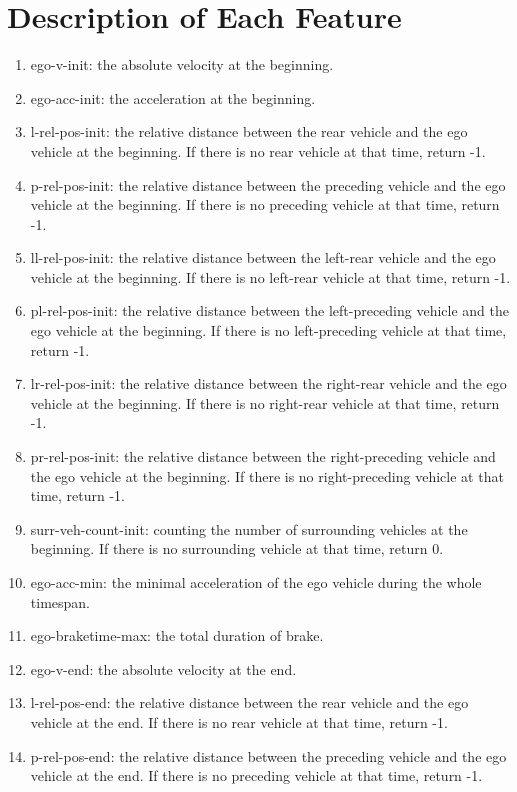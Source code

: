 \documentclass[conference]{IEEEtran}
\begin{document}
\section{Description of Each Feature}
\begin{enumerate}
\item ego-v-init: the absolute velocity at the beginning.
\item ego-acc-init: the acceleration at the beginning.
\item l-rel-pos-init: the relative distance between the rear vehicle and the ego vehicle at the beginning. If there is no rear vehicle at that time, return -1.
\item p-rel-pos-init: the relative distance between the preceding vehicle and the ego vehicle at the beginning. If there is no preceding vehicle at that time, return -1.
\item ll-rel-pos-init: the relative distance between the left-rear vehicle and the ego vehicle at the beginning. If there is no left-rear vehicle at that time, return -1.
\item pl-rel-pos-init: the relative distance between the left-preceding vehicle and the ego vehicle at the beginning. If there is no left-preceding vehicle at that time, return -1.
\item lr-rel-pos-init: the relative distance between the right-rear vehicle and the ego vehicle at the beginning. If there is no right-rear vehicle at that time, return -1.
\item pr-rel-pos-init: the relative distance between the right-preceding vehicle and the ego vehicle at the beginning. If there is no right-preceding vehicle at that time, return -1.
\item surr-veh-count-init: counting the number of surrounding vehicles at the beginning. If there is no surrounding vehicle at that time, return 0.
\item ego-acc-min: the minimal acceleration of the ego vehicle during the whole timespan.
\item ego-braketime-max: the total duration of brake. 
\item ego-v-end: the absolute velocity at the end.
\item l-rel-pos-end: the relative distance between the rear vehicle and the ego vehicle at the end. If there is no rear vehicle at that time, return -1.
\item p-rel-pos-end: the relative distance between the preceding vehicle and the ego vehicle at the end. If there is no preceding vehicle at that time, return -1.

\end{enumerate}
\end{document}
